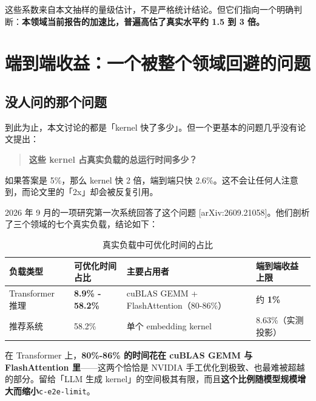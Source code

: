 这些系数来自本文抽样的量级估计，不是严格统计结论。但它们指向一个明确判断：\textbf{本领域当前报告的加速比，普遍高估了真实水平约 1.5 到 3 倍。}


\section{端到端收益：一个被整个领域回避的问题}

\subsection{没人问的那个问题}

到此为止，本文讨论的都是「kernel 快了多少」。但一个更基本的问题几乎没有论文提出：


\begin{quote}\small
\textbf{这些 kernel 占真实负载的总运行时间多少？}

\end{quote}

如果答案是 5\%，那么 kernel 快 2 倍，端到端只快 2.6\%。这不会让任何人注意到，而论文里的「2x」却会被反复引用。


2026 年 9 月的一项研究第一次系统回答了这个问题 [arXiv:2609.21058]。他们剖析了三个领域的七个真实负载，结论如下：


\begin{table}[t]
\centering
\footnotesize
\setlength{\tabcolsep}{4pt}
\caption{真实负载中可优化时间的占比}
\label{tab:11}
\begin{tabularx}{\textwidth}{llXl}
\toprule
负载类型 & 可优化时间占比 & 主要占用者 & 端到端收益上限 \\
\midrule
Transformer 推理 & \textbf{8.9\% -\hspace{0pt} 58.2\%} & cuBLAS GEMM + FlashAttention（80-\hspace{0pt}86\%） & 约 \textbf{1\%} \\
推荐系统 & 58.2\% & 单个 embedding kernel & 8.63\%（实测投影） \\
\bottomrule
\end{tabularx}
\end{table}


在 Transformer 上，\textbf{80\%-\hspace{0pt}86\% 的时间花在 cuBLAS GEMM 与 FlashAttention 里}——这两个恰恰是 NVIDIA 手工优化到极致、也最难被超越的部分。留给「LLM 生成 kernel」的空间极其有限，而且\textbf{这个比例随模型规模增大而缩小}{\scriptsize\texttt{c-\hspace{0pt}e2e-\hspace{0pt}limit}}。


